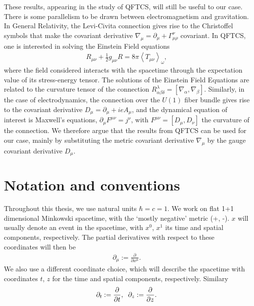 These results, appearing in the study of QFTCS, will still be useful to our case. There is some parallelism to be drawn between electromagnetism and gravitation. In General Relativity, the Levi-Civita connection gives rise to the Christoffel symbols that make the covariant derivative $\nabla_\mu = \partial_\mu + \Gamma^\nu_{\mu\rho}$ covariant. In QFTCS, one is interested in solving the Einstein Field equations 
\begin{align}
	R_{\mu\nu} + \frac{1}{2}g_{\mu\nu}R= 8\pi\left<T_{\mu\nu} \right>_\omega,
\end{align} 
where the field considered interacts with the spacetime through the expectation value of its stress-energy tensor. The solutions of the Einstein Field Equations are related to the curvature tensor of the connection $R^{\lambda}_{\alpha \beta \delta} = \left[ \nabla_\alpha, \nabla_\beta \right] $.
Similarly, in the case of electrodynamics, the connection over the $U(1)$ fiber bundle gives rise to the covariant derivative $D_\mu = \partial_\mu+ ie A_\mu $, and the dynamical equation of interest is Maxwell's equations, $\partial_\mu F^{\mu\nu}=j^{\nu}$, with $F^{\mu\nu} = [D_\mu, D_\nu]$ the curvature of the connection. We therefore argue that the results from QFTCS can be used for our case, mainly by substituting the metric covariant derivative $\nabla_\mu$ by the gauge covariant derivative $D_\mu$.

\newpage
\section*{Notation and conventions}

Throughout this thesis, we use natural units $\hbar = c = 1$. We work on flat 1+1 dimensional Minkowski spacetime, with the `mostly negative' metric (+, -). $x$ will usually denote an event in the spacetime, with $x^{0}$, $x^{1}$ its time and spatial components, respectively. The partial derivatives with respect to these coordinates will then be 
\begin{align}
\partial_\mu := 	\frac{\partial}{\partial x^{\mu}}.
\end{align}
We also use a different coordinate choice,  which will describe the spacetime with coordinates $t$, $z$ for the time and spatial components, respectively. Similary 
\begin{align}
	\partial_t:= 	\frac{\partial}{\partial t}, \hspace{0.2cm}  \hfill
\partial_z:= 	\frac{\partial}{\partial z}.
\end{align}

